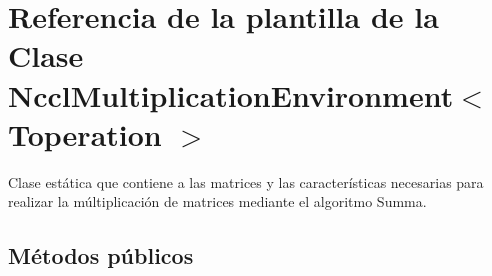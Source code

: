 \hypertarget{classNcclMultiplicationEnvironment}{}\section{Referencia de la plantilla de la Clase Nccl\+Multiplication\+Environment$<$ Toperation $>$}
\label{classNcclMultiplicationEnvironment}


Clase estática que contiene a las matrices y las características necesarias para realizar la múltiplicación de matrices mediante el algoritmo Summa.  


\subsection*{Métodos públicos}
